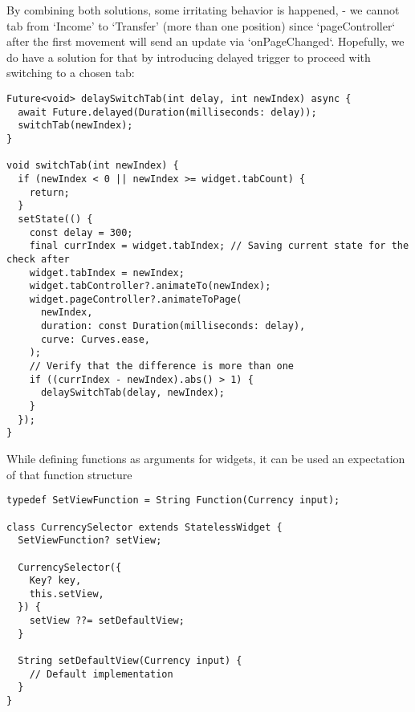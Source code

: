 By combining both solutions, some irritating behavior is happened, - we cannot tab from `Income' to `Transfer' 
(more than one position) since `pageController` after the first movement will send an update via `onPageChanged`. 
Hopefully, we do have a solution for that by introducing delayed trigger to proceed with switching to a chosen tab:

\begin{lstlisting}
Future<void> delaySwitchTab(int delay, int newIndex) async {
  await Future.delayed(Duration(milliseconds: delay));
  switchTab(newIndex);
}

void switchTab(int newIndex) {
  if (newIndex < 0 || newIndex >= widget.tabCount) {
    return;
  }
  setState(() {
    const delay = 300;
    final currIndex = widget.tabIndex; // Saving current state for the check after 
    widget.tabIndex = newIndex;
    widget.tabController?.animateTo(newIndex);
    widget.pageController?.animateToPage(
      newIndex,
      duration: const Duration(milliseconds: delay),
      curve: Curves.ease,
    );
    // Verify that the difference is more than one
    if ((currIndex - newIndex).abs() > 1) {
      delaySwitchTab(delay, newIndex);
    }
  });
}
\end{lstlisting}

While defining functions as arguments for widgets, it can be used an expectation of that function structure

\begin{lstlisting}
typedef SetViewFunction = String Function(Currency input);

class CurrencySelector extends StatelessWidget {
  SetViewFunction? setView;

  CurrencySelector({
    Key? key,
    this.setView,
  }) {
    setView ??= setDefaultView;
  }

  String setDefaultView(Currency input) {
    // Default implementation
  }
}
\end{lstlisting}